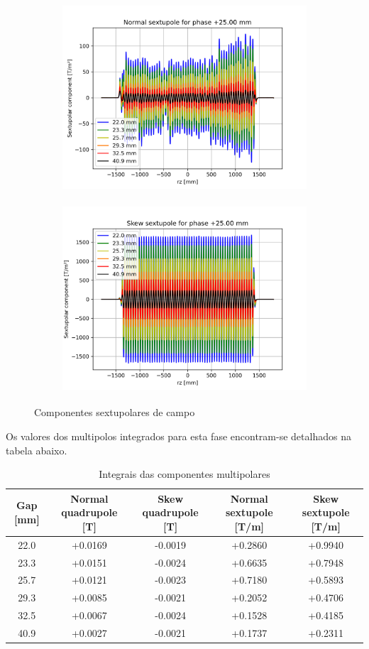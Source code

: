 \documentclass[a4paper,12pt]{article}
\begin{document}
\begin{figure}[H]
\begin{subfigure}{0.5\textwidth}
\includegraphics[width=0.9\linewidth, height=7cm]{figs/phase25 Normal sextupole.png} 
\label{fig:subim125s}
\end{subfigure}
\begin{subfigure}{0.5\textwidth}
\includegraphics[width=0.9\linewidth, height=7cm]{figs/phase25 Skew sextupole.png}
\label{fig:subim225s}
\end{subfigure}
\caption{Componentes sextupolares de campo}
\label{fig:sext25}
\end{figure}

Os valores dos multipolos integrados para esta fase encontram-se detalhados na tabela abaixo.

\begin{table}[H]\footnotesize
\caption{Integrais das componentes multipolares}
\centering
\begin{tabular}{|c|c|c|c|c|}
\hline
   Gap [mm] &   Normal quadrupole [T] &   Skew quadrupole [T] &   Normal sextupole [T/m] &   Skew sextupole [T/m] \\
\hline
22.0 & +0.0169 & -0.0019 & +0.2860 & +0.9940 \\
23.3 & +0.0151 & -0.0024 & +0.6635 & +0.7948 \\
25.7 & +0.0121 & -0.0023 & +0.7180 & +0.5893 \\
29.3 & +0.0085 & -0.0021 & +0.2052 & +0.4706 \\
32.5 & +0.0067 & -0.0024 & +0.1528 & +0.4185 \\
40.9 & +0.0027 & -0.0021 & +0.1737 & +0.2311 \\
\hline
\end{tabular}
\end{table}
\end{document}
